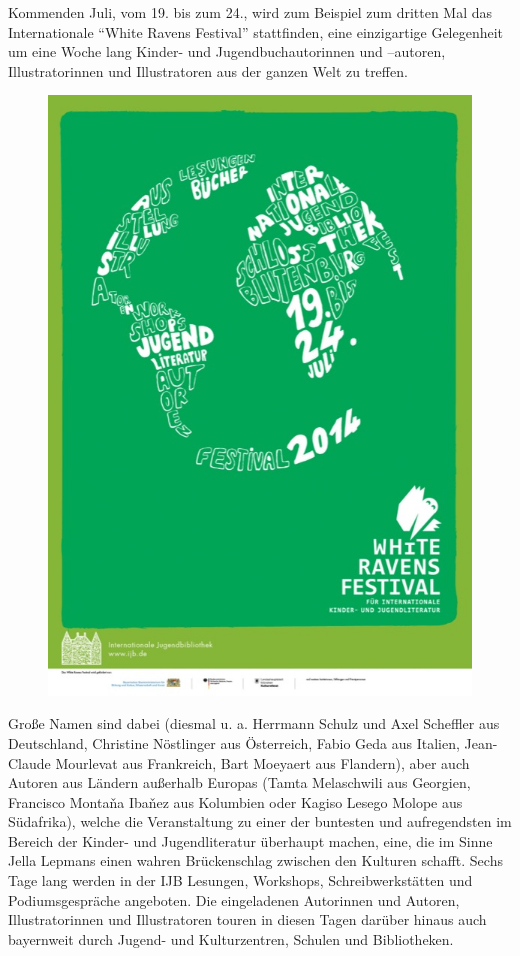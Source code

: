 \documentclass[a4paper,
fontsize=11pt,
oneside,
numbers=noperiodatend,
parskip=half-,
bibliography=totoc,
final
]{scrartcl}
\begin{document}
Kommenden Juli, vom 19. bis zum 24., wird zum Beispiel zum dritten Mal
das Internationale \enquote{White Ravens Festival} stattfinden, eine
einzigartige Gelegenheit um eine Woche lang Kinder- und
Jugendbuchautorinnen und --autoren, Illustratorinnen und Illustratoren
aus der ganzen Welt zu treffen.~

\begin{figure}[htbp]
\centering
\includegraphics{img/bild20.jpg}
\end{figure}

Große Namen sind dabei (diesmal u. a. Herrmann Schulz und Axel Scheffler
aus Deutschland, Christine Nöstlinger aus Österreich, Fabio Geda aus
Italien, Jean-Claude Mourlevat aus Frankreich, Bart Moeyaert aus
Flandern), aber auch Autoren aus Ländern außerhalb Europas (Tamta
Melaschwili aus Georgien, Francisco Montaňa Ibaňez aus Kolumbien oder
Kagiso Lesego Molope aus Südafrika), welche die Veranstaltung zu einer
der buntesten und aufregendsten im Bereich der Kinder- und
Jugendliteratur überhaupt machen, eine, die im Sinne Jella Lepmans einen
wahren Brückenschlag zwischen den Kulturen schafft. Sechs Tage lang
werden in der IJB Lesungen, Workshops, Schreibwerkstätten und
Podiumsgespräche angeboten. Die eingeladenen Autorinnen und Autoren,
Illustratorinnen und Illustratoren touren in diesen Tagen darüber hinaus
auch bayernweit durch Jugend- und Kulturzentren, Schulen und
Bibliotheken.
\end{document}
